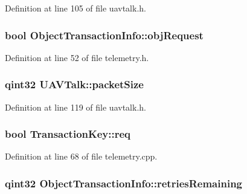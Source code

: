 \-Definition at line 105 of file uavtalk.\-h.

\hypertarget{group___u_a_v_talk_plugin_ga35e10d2ea8bcd4f4bd1e32db43857e2c}{
\subsubsection[{obj\-Request}]{\setlength{\rightskip}{0pt plus 5cm}bool {\bf \-Object\-Transaction\-Info\-::obj\-Request}}}\label{group___u_a_v_talk_plugin_ga35e10d2ea8bcd4f4bd1e32db43857e2c}


\-Definition at line 52 of file telemetry.\-h.

\hypertarget{group___u_a_v_talk_plugin_gaa014be97504e5d24ac39f2808976685e}{
\subsubsection[{packet\-Size}]{\setlength{\rightskip}{0pt plus 5cm}qint32 {\bf \-U\-A\-V\-Talk\-::packet\-Size}}}\label{group___u_a_v_talk_plugin_gaa014be97504e5d24ac39f2808976685e}


\-Definition at line 119 of file uavtalk.\-h.

\hypertarget{group___u_a_v_talk_plugin_gafe5007a7f451f47110150ee417594a38}{
\subsubsection[{req}]{\setlength{\rightskip}{0pt plus 5cm}bool {\bf \-Transaction\-Key\-::req}}}\label{group___u_a_v_talk_plugin_gafe5007a7f451f47110150ee417594a38}


\-Definition at line 68 of file telemetry.\-cpp.

\hypertarget{group___u_a_v_talk_plugin_gaf7cfad07635a777272c96c4b2fb2284b}{
\subsubsection[{retries\-Remaining}]{\setlength{\rightskip}{0pt plus 5cm}qint32 {\bf \-Object\-Transaction\-Info\-::retries\-Remaining}}}\label{group___u_a_v_talk_plugin_gaf7cfad07635a777272c96c4b2fb2284b}


